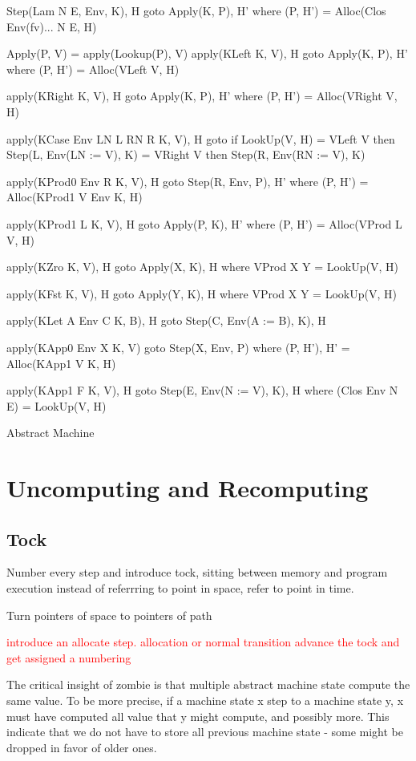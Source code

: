 \documentclass[acmsmall]{acmart}
\newcommand\todo[1]{\textcolor{red}{#1}}
\begin{document}
\begin{mdframed}
		Step(Lam N E, Env, K), H goto Apply(K, P), H' where (P, H') = Alloc(Clos Env(fv)... N E, H)

		Apply(P, V) = apply(Lookup(P), V)
		apply(KLeft K, V), H goto Apply(K, P), H' where (P, H') = Alloc(VLeft V, H)

		apply(KRight K, V), H goto Apply(K, P), H' where (P, H') = Alloc(VRight V, H)
		
		apply(KCase Env LN L RN R K, V), H goto 
		  if LookUp(V, H) = VLeft V then Step(L, Env(LN := V), K)
		  = VRight V then Step(R, Env(RN := V), K)
		
		apply(KProd0 Env R K, V), H goto Step(R, Env, P), H' where (P, H') = Alloc(KProd1 V Env K, H)
		
		apply(KProd1 L K, V), H goto Apply(P, K), H' where (P, H') = Alloc(VProd L V, H)
		
		apply(KZro K, V), H goto Apply(X, K), H where VProd X Y = LookUp(V, H)

		apply(KFst K, V), H goto Apply(Y, K), H where VProd X Y = LookUp(V, H)
		
		apply(KLet A Env C K, B), H goto Step(C, Env(A := B), K), H
		
		apply(KApp0 Env X K, V) goto Step(X, Env, P) where (P, H'), H' = Alloc(KApp1 V K, H)
		
		apply(KApp1 F K, V), H goto Step(E, Env(N := V), K), H where (Clos Env N E) = LookUp(V, H)

		Abstract Machine
	\end{mdframed}
	\section{Uncomputing and Recomputing}
	\subsection{Tock}
	Number every step and introduce tock, sitting between memory and program execution
	instead of referrring to point in space, refer to point in time.

	Turn pointers of space to pointers of path
	
	\todo{introduce an allocate step. allocation or normal transition advance the tock and get assigned a numbering}
	
	The critical insight of zombie is that multiple abstract machine state compute the same value. To be more precise, if a machine state x step to a machine state y, x must have computed all value that y might compute, and possibly more. This indicate that we do not have to store all previous machine state - some might be dropped in favor of older ones.
	
\end{document}
